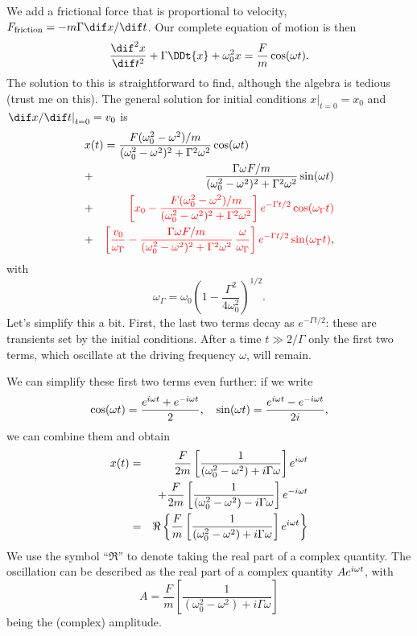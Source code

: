\begin{sidebar}
We add a frictional force that is proportional to velocity, $F_{\mathrm{friction}} = -m\Gamma \dif x/\dif t$. Our complete equation of motion is then
\begin{equation}
	\DDtt{x} + \Gamma \DDt{x} + \omega_{0}^{2}x = \frac{F}{m}\cos(\omega t).
\end{equation}
The solution to this is straightforward to find, although the algebra is tedious (trust me on this). The general solution for initial conditions $\left.x\right|_{t=0} = x_{0}$ and $\left.\dif x/\dif t\right|_{t=0} = v_{0}$ is
\begin{eqnarray}
\label{e.general-solution-ddo}
\lefteqn{x(t) = \frac{F\womw/m}{\womw^{2}+\gw}\cos(\omega t)} && \\
	&+& \frac{\Gamma\omega F/m}{\womw^{2}+\gw}\sin(\omega t)\nonumber \\
	&+& {\color{red}\left[x_{0}-\frac{F\womw/m}{\womw^{2}+\gw}\right] e^{-\Gamma t/2} \cos(\omega_{\Gamma}t)} \nonumber\\
	&+& {\color{red}\left[\frac{v_{0}}{\omega_{\Gamma}}-\frac{\Gamma\omega F/m}{\womw^{2}+\gw}
	\,\frac{\omega}{\omega_{\Gamma}}\right]e^{-\Gamma t/2} \sin(\omega_{\Gamma}t)}, 
	\nonumber
\end{eqnarray}
with
\[ 
    \omega_{\Gamma} = 
        \omega_{0}\left(1-\frac{\Gamma^{2}}{4\omega_{0}^{2}}\right)^{1/2}.
\]
Let's simplify this a bit.  First, the last two terms decay as $e^{-\Gamma t/2}$: these are transients set by the initial conditions. After a time $t \gg 2/\Gamma$ only the first two terms, which oscillate at the driving frequency $\omega$, will remain. 

We can simplify these first two terms even further: if we write
\[ \cos(\omega t) = \frac{e^{i\omega t}+e^{-i\omega t}}{2},\quad \sin(\omega t) 
    = \frac{e^{i\omega t}-e^{-i\omega t}}{2i}, \]
we can combine them and obtain
\begin{eqnarray}
    x(t) &=& \frac{F}{2m}\left[\frac{1}{\left(\omega_0^2-\omega^2\right) + i\Gamma\omega}\right]e^{i\omega t} \nonumber\\
    && + \frac{F}{2m}\left[\frac{1}{\left(\omega_0^2-\omega^2\right) - i\Gamma\omega}\right]e^{-i\omega t} \nonumber\\
    &=& \Re\left\{\frac{F}{m}\left[\frac{1}{\left(\omega_0^2-\omega^2\right) + i\Gamma\omega}\right]e^{i\omega t}\right\}\label{e.oscillator-expression}
\end{eqnarray}
We use the symbol ``$\Re$'' to denote taking the real part of a complex quantity.
The oscillation can be described as the real part of a complex quantity $Ae^{i\omega t}$, with
\[
    A = \frac{F}{m}\left[\frac{1}{\left(\omega_0^2-\omega^2\right) + i\Gamma\omega}\right]
\]
being the (complex) amplitude.


\end{sidebar}
